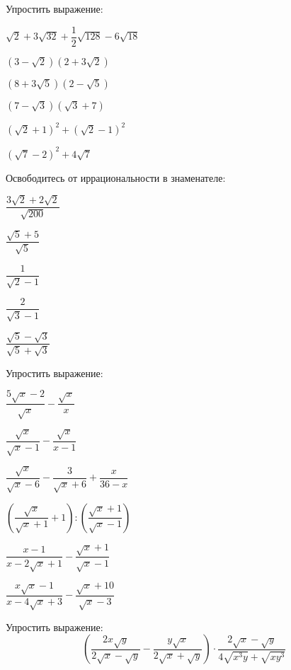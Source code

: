 \begin{enumcols}[label=\textbf{\arabic*.}]
	\item Упростить выражение:
	\begin{enumcols}[itemcolumns=2]
		\item \( \sqrt{2}+3\sqrt{32}+\dfrac{1}{2}\sqrt{128}-6\sqrt{18} \)
		\item \( (3-\sqrt{2})(2+3\sqrt{2}) \)
		\item \( (8+3\sqrt{5})(2-\sqrt{5}) \)
		\item \( (7-\sqrt{3})(\sqrt{3}+7) \)
		\item \( (\sqrt{2}+1)^2+(\sqrt{2}-1)^2 \)
		\item \( (\sqrt{7}-2)^2+4\sqrt{7} \)
	\end{enumcols}
	\item Освободитесь от иррациональности в знаменателе:
	\begin{enumcols}[itemcolumns=5]
		\item \( \dfrac{3\sqrt{2}+2\sqrt{2}}{\sqrt{200}} \)
		\item \( \dfrac{\sqrt{5}+5}{\sqrt{5}} \)
		\item \( \dfrac{1}{\sqrt{2}-1} \)
		\item \( \dfrac{2}{\sqrt{3}-1} \)
		\item \( \dfrac{\sqrt{5}-\sqrt{3}}{\sqrt{5}+\sqrt{3}} \)
	\end{enumcols}
	\item Упростить выражение:
	\begin{enumcols}[itemcolumns=2]
		\item \( \dfrac{5\sqrt{x}-2}{\sqrt{x}}-\dfrac{\sqrt{x}}{x} \)
		\item \( \dfrac{\sqrt{x}}{\sqrt{x}-1}-\dfrac{\sqrt{x}}{x-1} \)
		\item \( \dfrac{\sqrt{x}}{\sqrt{x}-6}-\dfrac{3}{\sqrt{x}+6}+\dfrac{x}{36-x} \)
		\item \( \left( \dfrac{\sqrt{x}}{\sqrt{x}+1}+1 \right):\left( \dfrac{\sqrt{x}+1}{\sqrt{x}-1} \right) \)
		\item \( \dfrac{x-1}{x-2\sqrt{x}+1}-\dfrac{\sqrt{x}+1}{\sqrt{x}-1} \)
		\item \( \dfrac{x\sqrt{x}-1}{x-4\sqrt{x}+3}-\dfrac{\sqrt{x}+10}{\sqrt{x}-3} \)
	\end{enumcols}
	\item Упростить выражение:
	\[ \left( \dfrac{2x\sqrt{y}}{2\sqrt{x}-\sqrt{y}}-\dfrac{y\sqrt{x}}{2\sqrt{x}+\sqrt{y}} \right)\cdot\dfrac{2\sqrt{x}-\sqrt{y}}{4\sqrt{x^3y}+\sqrt{xy^3}} \]

\end{enumcols}
